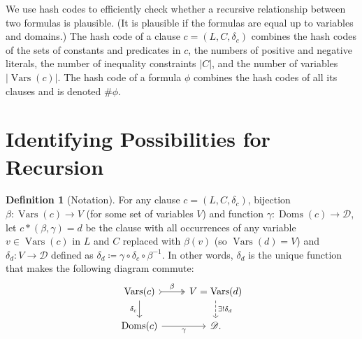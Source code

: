 \documentclass{article}
\theoremstyle{definition}
\newtheorem{definition}{Definition}
\DeclareMathOperator{\Doms}{Doms}
\DeclareMathOperator{\Vars}{Vars}
\begin{document}
We use hash codes to efficiently check whether a recursive relationship between two formulas is plausible. (It is plausible if the formulas are equal up to variables and domains.) The hash code of a clause $c = (L, C, \delta_c)$ combines the hash codes of the sets of constants and predicates in $c$, the numbers of positive and negative literals, the number of inequality constraints $|C|$, and the number of variables $|\Vars(c)|$. The hash code of a formula $\phi$ combines the hash codes of all its clauses and is denoted $\#\phi$.

\section{Identifying Possibilities for Recursion}

\begin{definition}[Notation]
  For any clause $c = (L, C, \delta_c)$, bijection $\beta\colon \Vars(c) \to V$ (for some set of variables $V$) and function $\gamma\colon \Doms(c) \to \mathscr{D}$, let $c \ast (\beta, \gamma) = d$ be the clause with all occurrences of any variable $v \in \Vars(c)$ in $L$ and $C$ replaced with $\beta(v)$ (so $\Vars(d) = V$) and $\delta_d\colon V \to \mathscr{D}$ defined as $\delta_d \coloneqq \gamma \circ \delta_c \circ \beta^{-1}$. In other words, $\delta_d$ is the unique function that makes the following diagram commute:
  \[
  \begin{tikzcd}
    \Vars(c) \ar[r, tail, two heads, "\beta"] \arrow[d, swap, "\delta_c"] & V = \Vars(d) \ar[d, dashed, "\exists!\delta_d"] \\
    \Doms(c) \ar[r, swap, "\gamma"] & \mathscr{D}.
  \end{tikzcd}
  \]
\end{definition}
\end{document}
